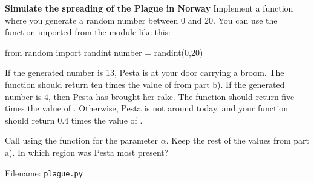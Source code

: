 \begin{Problem}{\textbf{Simulate the spreading of the Plague in Norway}}
Implement a function  where you generate a random number between 0 and 20. You can use the  function imported from the  module like this: 
\begin{python}
from random import randint
number = randint(0,20)
\end{python}
If the generated number is 13, Pesta is at your door carrying a broom. The function should return ten times the value of  from part b).
If the generated number is 4, then Pesta has brought her rake. The function should return five times the value of .
Otherwise, Pesta is not around today, and your function should return 0.4 times the value of .

Call  using the  function for the parameter $\alpha$. Keep the rest of the values from part a). In which region was Pesta most present? 

Filename: \texttt{plague.py}

\end{Problem}